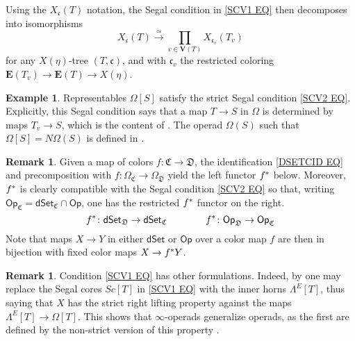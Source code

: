\documentclass[a4paper,10pt]{article}%
\numberwithin{equation}{section}
\numberwithin{figure}{section}
\theoremstyle{definition} %
\newtheorem{example}[equation]{Example}%
\newtheorem{remark}[equation]{Remark}%
\newcommand{\Op}{\mathsf{Op}}
\newcommand{\dSet}{\mathsf{dSet}}
\begin{document}
Using the $X_{\mathfrak c}(T)$ notation, 
the Segal condition in \eqref{SCV1 EQ}
then decomposes into isomorphisms
	\begin{equation}\label{SCV2 EQ}
	X_{\mathfrak c}(T) \xrightarrow{\simeq} \prod_{v \in \boldsymbol{V}(T)} X_{\mathfrak c_v}(T_v)
	\end{equation}
for any $X(\eta)$-tree $(T,\mathfrak{c})$,
and with $\mathfrak{c}_v$
the restricted coloring
$\boldsymbol{E}(T_v) \to \boldsymbol{E}(T) \to X(\eta)$.


\begin{example}\label{OMTSEG EX}
	Representables $\Omega[S]$ satisfy
	the strict Segal condition \eqref{SCV2 EQ}.
	Explicitly, this Segal condition says
	that a map
	$T\to S$ in $\Omega$ is determined by maps
	$T_v\to S$, 
	which is the content of \cite[Prop. 5.11]{Per18}.
	The operad $\Omega(S)$
	such that $\Omega[S] = N \Omega(S)$
	is defined in \cite[\S 3]{MW07}.
\end{example}


\begin{remark}\label{PULLBACKS REM}
Given a map of colors 
$f \colon \mathfrak{C} \to \mathfrak{D}$,
the identification \eqref{DSETCID EQ}
and precomposition with 
$f\colon \Omega_\mathfrak{C} \to \Omega_\mathfrak{D}$
yield the left functor $f^{\**}$ below.
Moreover, $f^{\**}$ is clearly compatible with the Segal condition
\eqref{SCV2 EQ} so that, writing
$\Op_{\mathfrak{C}} = \dSet_{\mathfrak{C}} \cap \Op$,
one has the restricted $f^{\**}$ functor on the right.
\[
f^{\**} \colon \dSet_{\mathfrak{D}} \to \dSet_{\mathfrak{C}}
\qquad \qquad
f^{\**} \colon \Op_{\mathfrak{D}} \to \Op_{\mathfrak{C}}
\]
Note that maps $X \to Y$ in either $\dSet$ or $\Op$
over a color map $f$ are then in bijection with fixed color maps
$X \to f^{\**} Y$.
\end{remark}


\begin{remark}\label{SSCOTHER REM}
	Condition \eqref{SCV1 EQ} has other formulations.
	Indeed, by \cite[Props. 3.22, 3.31]{BP_edss}
	one may replace the Segal cores $Sc[T]$
	in \eqref{SCV1 EQ} with the inner horns $\Lambda^E[T]$,
	thus saying that $X$ has the strict
	right lifting property against the maps
	$\Lambda^E[T] \to \Omega[T]$.
	This shows that $\infty$-operads generalize operads,
	as the first are defined by the 
	non-strict version of this property \cite[\S 5]{MW09}.
\end{remark}
\end{document}
